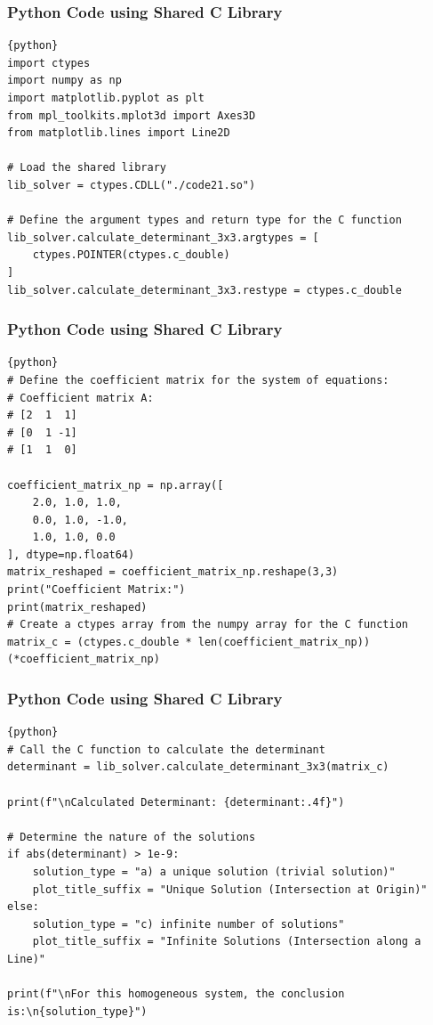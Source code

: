 \documentclass{beamer}
\begin{document}
\begin{frame}[fragile]
\frametitle{Python Code using Shared C Library}
\begin{lstlisting}{python}
import ctypes
import numpy as np
import matplotlib.pyplot as plt
from mpl_toolkits.mplot3d import Axes3D
from matplotlib.lines import Line2D

# Load the shared library
lib_solver = ctypes.CDLL("./code21.so")

# Define the argument types and return type for the C function
lib_solver.calculate_determinant_3x3.argtypes = [
    ctypes.POINTER(ctypes.c_double)
]
lib_solver.calculate_determinant_3x3.restype = ctypes.c_double
\end{lstlisting}
\end{frame}

\begin{frame}[fragile]
\frametitle{Python Code using Shared C Library}
\begin{lstlisting}{python}
# Define the coefficient matrix for the system of equations:
# Coefficient matrix A:
# [2  1  1]
# [0  1 -1]
# [1  1  0]

coefficient_matrix_np = np.array([
    2.0, 1.0, 1.0,
    0.0, 1.0, -1.0,
    1.0, 1.0, 0.0
], dtype=np.float64)
matrix_reshaped = coefficient_matrix_np.reshape(3,3)
print("Coefficient Matrix:")
print(matrix_reshaped)
# Create a ctypes array from the numpy array for the C function
matrix_c = (ctypes.c_double * len(coefficient_matrix_np))(*coefficient_matrix_np)
\end{lstlisting}
\end{frame}

\begin{frame}[fragile]
\frametitle{Python Code using Shared C Library }
\begin{lstlisting}{python}
# Call the C function to calculate the determinant
determinant = lib_solver.calculate_determinant_3x3(matrix_c)

print(f"\nCalculated Determinant: {determinant:.4f}")

# Determine the nature of the solutions
if abs(determinant) > 1e-9:
    solution_type = "a) a unique solution (trivial solution)"
    plot_title_suffix = "Unique Solution (Intersection at Origin)"
else:
    solution_type = "c) infinite number of solutions"
    plot_title_suffix = "Infinite Solutions (Intersection along a Line)"

print(f"\nFor this homogeneous system, the conclusion is:\n{solution_type}")
\end{lstlisting}
\end{frame}
\end{document}

